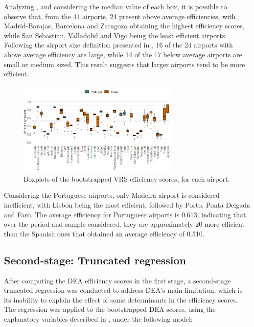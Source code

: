 Analyzing , and considering the median value of each box, it is possible to observe
that, from the 41 airports, 24 present above average efficiencies, with Madrid-Barajas, Barcelona and
Zaragoza obtaining the highest efficiency scores, while San Sebastian, Valladolid and Vigo being the
least efficient airports. Following the airport size definition presented in , 16 of the 24 airports
with above average efficiency are large, while 14 of the 17 below average airports are small or medium
sized. This result suggests that larger airports tend to be more efficient. 

  \vspace{-0.4cm}

\begin{figure}[h!]
  \centering
  \includegraphics[width=8cm]{images/Rplot01.png}
  \vspace{-0.8cm}
  \caption{Boxplots of the bootstrapped VRS efficiency scores, for each airport.}
  \label{fig:boxplot}
\end{figure}

\vspace{-0.3cm}

Considering the Portuguese airports, only Madeira airport is considered inefficient, with Lisbon being
the most efficient, followed by Porto, Ponta Delgada and Faro. The average efficiency for Portuguese
airports is 0.613, indicating that, over the period and sample considered, they are approximately 20 %
more efficient than the Spanish ones that obtained an average efficiency of 0.510.




\vspace{-0.1cm}
\subsection{Second-stage: Truncated regression }
\label{subsec:resul_trunc}

After computing the DEA efficiency scores in the first stage, a second-stage truncated regression
was conducted to address DEA’s main limitation, which is its inability to explain the effect of some
determinants in the efficiency scores. The regression was applied to the bootstrapped DEA scores, using the explanatory variables described in , under the following model:

